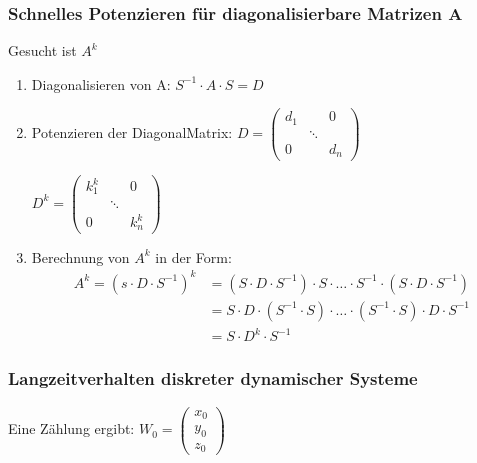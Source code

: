 \documentclass{article}
\newcommand{\vvvec}[3]{\begin{pmatrix}#1\\#2\\#3\end{pmatrix}}
\begin{document}
\subsubsection{Schnelles Potenzieren für diagonalisierbare Matrizen A}

Gesucht ist $A^k$
\begin{enumerate}
    \item Diagonalisieren von A: $S^{-1} \cdot A \cdot S = D$
    \item Potenzieren der DiagonalMatrix: $D = \begin{pmatrix}
        d_1 & & 0\\
        & \ddots &\\
        0 & & d_n
    \end{pmatrix}$
    
    $D^k = \begin{pmatrix}
        k_1^k & & 0\\
        & \ddots &\\
        0 & & k_n^k
    \end{pmatrix}$
    \item Berechnung von $A^k$ in der Form:
    \begin{align*}
        A^k = (s \cdot D \cdot S^{-1})^k &= (S \cdot D \cdot S^{-1}) \cdot S \cdot \dots \cdot S^{-1} \cdot (S \cdot D \cdot S^{-1})\\
        &= S \cdot D \cdot (S^{-1} \cdot S) \cdot \dots \cdot (S^{-1} \cdot S) \cdot D \cdot S^{-1}\\
        &= S \cdot D^k \cdot S^{-1}
    \end{align*}
\end{enumerate}

\subsubsection{Langzeitverhalten diskreter dynamischer Systeme}

Eine Zählung ergibt: $W_0 = \vvvec{x_0}{y_0}{z_0}$
\end{document}
